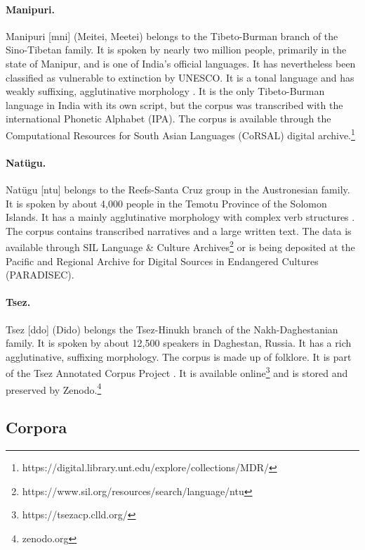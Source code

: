 \paragraph{Manipuri.}
Manipuri [mni] (Meitei, Meetei) belongs to the Tibeto-Burman branch of the Sino-Tibetan family. It is spoken by nearly two million people, primarily in the state of Manipur, and is one of India's official languages. It has nevertheless been classified as vulnerable to extinction by UNESCO. It is a tonal language and has weakly suffixing, agglutinative morphology \citep{Chelliah-1997}. It is the only Tibeto-Burman language in India with its own script, but the corpus was transcribed with the international Phonetic Alphabet (IPA). The corpus is available through the Computational Resources for South Asian Languages (CoRSAL) digital archive.\footnote{https://digital.library.unt.edu/explore/collections/MDR/}

\paragraph{Natügu.}
Natügu [ntu] belongs to the Reefs-Santa Cruz group in the Austronesian family. It is spoken by about 4,000 people in the Temotu Province of the Solomon Islands. It has a mainly agglutinative morphology with complex verb structures \citep{naess_ntu_2008}. The corpus contains transcribed narratives and a large written text. The data is available through SIL Language & Culture Archives\footnote{https://www.sil.org/resources/search/language/ntu} or is being deposited at the Pacific and Regional Archive for Digital Sources in Endangered Cultures (PARADISEC).

\paragraph{Tsez.}
Tsez [ddo] (Dido) belongs the Tsez-Hinukh branch of the Nakh-Daghestanian family. It is spoken by about 12,500 speakers in Daghestan, Russia. It has a rich agglutinative, suffixing morphology. The corpus is made up of folklore. It is part of the Tsez Annotated Corpus Project \citep{abdulaev-tsezcorpus-2010}. It is available online\footnote{https://tsezacp.clld.org/} and is stored and preserved by Zenodo.\footnote{zenodo.org}

\subsection{Corpora}

